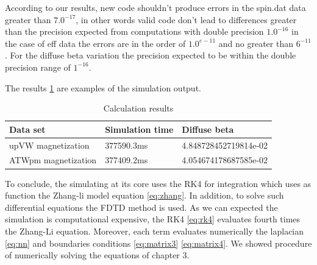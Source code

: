 According to our results, new code shouldn't produce errors in the spin.dat data greater than $7.0^{-17}$, in other words valid code don't lead to differences greater than the precision expected from computations with double precision $1.0^{-16}$ in the case of eff data the errors are in the order of $1.0^{e-11}$ and no greater than $6^{-11}$. For the diffuse beta variation the precision expected to be within the double precision range of $1^{-16}$. 

The results \ref{tab:results} are examples of the simulation output.

\begin{table}[h]
\centering
\begin{tabular}{| l | l | l |}
\hline
Data set & Simulation time & Diffuse beta  \\
\hline
upVW magnetization & 377590.3ms & 4.848728452719814e-02 \\
\hline
ATWpm magnetization & 377409.2ms & 4.054674178687585e-02 \\
\hline
\end{tabular}
\caption{Calculation results}
\label{tab:results}
\end{table}


\vspace{3.5em}

To conclude, the simulating at its core uses the RK4 for integration which uses as function the Zhang-li model equation \ref{eq:zhang}. In addition, to solve such differential equations the FDTD method is used. As we can expected the simulation is computational expensive, the RK4 \ref{eq:rk4} evaluates fourth times the Zhang-Li equation. Moreover, each term evaluates numerically the  laplacian \ref{eq:nn} and boundaries conditions \ref{eq:matrix3} \ref{eq:matrix4}. We showed procedure of numerically solving the equations of chapter 3.



